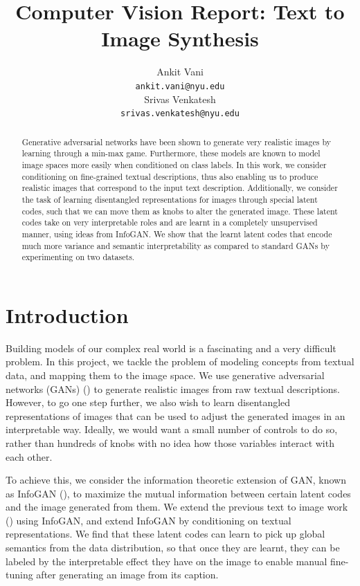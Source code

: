 \documentclass{article}
\title{Computer Vision Report: Text to Image Synthesis}
\author{
  Ankit Vani \\
  \texttt{ankit.vani@nyu.edu} \\
  \And
  Srivas Venkatesh \\
  \texttt{srivas.venkatesh@nyu.edu} \\
}
\begin{document}
\maketitle

\begin{abstract}
Generative adversarial networks have been shown to generate very realistic images by learning through a min-max game. Furthermore, these models are known to model image spaces more easily when conditioned on class labels. In this work, we consider conditioning on fine-grained textual descriptions, thus also enabling us to produce realistic images that correspond to the input text description. Additionally, we consider the task of learning disentangled representations for images through special latent codes, such that we can move them as knobs to alter the generated image. These latent codes take on very interpretable roles and are learnt in a completely unsupervised manner, using ideas from InfoGAN. We show that the learnt latent codes that encode much more variance and semantic interpretability as compared to standard GANs by experimenting on two datasets.
\end{abstract}


\section{Introduction}

Building models of our complex real world is a fascinating and a very difficult problem. In this project, we tackle the problem of modeling concepts from textual data, and mapping them to the image space. We use generative adversarial networks (GANs) (\cite{gan}) to generate realistic images from raw textual descriptions. However, to go one step further, we also wish to learn disentangled representations of images that can be used to adjust the generated images in an interpretable way. Ideally, we would want a small number of controls to do so, rather than hundreds of knobs with no idea how those variables interact with each other.

To achieve this, we consider the information theoretic extension of GAN, known as InfoGAN (\cite{infogan}), to maximize the mutual information between certain latent codes and the image generated from them. We extend the previous text to image work (\cite{text2image}) using InfoGAN, and extend InfoGAN by conditioning on textual representations. We find that these latent codes can learn to pick up global semantics from the data distribution, so that once they are learnt, they can be labeled by the interpretable effect they have on the image to enable manual fine-tuning after generating an image from its caption.
\end{document}
